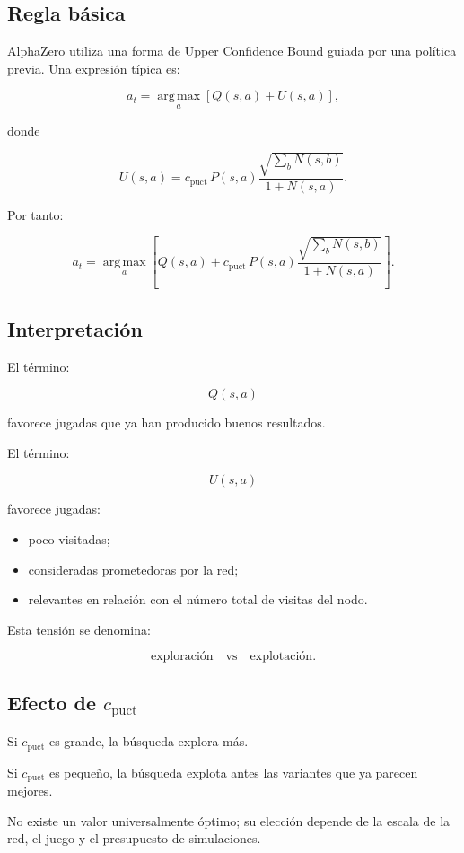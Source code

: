 \documentclass[11pt,a4paper]{article}
\newcommand{\argmax}{\operatorname*{arg\,max}}
\begin{document}
\subsection{Regla básica}

AlphaZero utiliza una forma de Upper Confidence Bound guiada por una política previa. Una expresión típica es:

\[
a_t
=
\argmax_a
\left[
Q(s,a)
+
U(s,a)
\right],
\]

donde

\[
U(s,a)
=
c_{\mathrm{puct}}\,
P(s,a)
\frac{\sqrt{\sum_b N(s,b)}}
{1+N(s,a)}.
\]

Por tanto:

\[
a_t
=
\argmax_a
\left[
Q(s,a)
+
c_{\mathrm{puct}}\,
P(s,a)
\frac{\sqrt{\sum_b N(s,b)}}
{1+N(s,a)}
\right].
\]

\subsection{Interpretación}

El término:

\[
Q(s,a)
\]

favorece jugadas que ya han producido buenos resultados.

El término:

\[
U(s,a)
\]

favorece jugadas:

\begin{itemize}
    \item poco visitadas;
    \item consideradas prometedoras por la red;
    \item relevantes en relación con el número total de visitas del nodo.
\end{itemize}

Esta tensión se denomina:

\[
\text{exploración}
\quad\text{vs}\quad
\text{explotación}.
\]

\subsection{Efecto de \(c_{\mathrm{puct}}\)}

Si \(c_{\mathrm{puct}}\) es grande, la búsqueda explora más.

Si \(c_{\mathrm{puct}}\) es pequeño, la búsqueda explota antes las variantes que ya parecen mejores.

No existe un valor universalmente óptimo; su elección depende de la escala de la red, el juego y el presupuesto de simulaciones.
\end{document}
